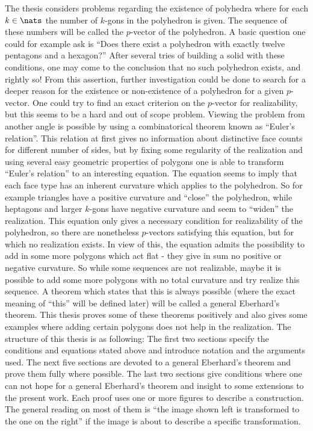 The thesis considers problems regarding the existence of polyhedra where for each $k \in \nats$ the number of $k$-gons in the polyhedron is given. The sequence of these numbers will be called the $p$-vector of the polyhedron. A basic question one could for example ask is ``Does there exist a polyhedron with exactly twelve pentagons and a hexagon?'' After several tries of building a solid with these conditions, one may come to the conclusion that no such polyhedron exists, and rightly so! From this assertion, further investigation could be done to search for a deeper reason for the existence or non-existence of a polyhedron for a given $p$-vector. One could try to find an exact criterion on the $p$-vector for realizability, but this seems to be a hard and out of scope problem. Viewing the problem from another angle is possible by using a combinatorical theorem known as ``Euler's relation''. This relation at first gives no information about distinctive face counts for different number of sides, but by fixing some regularity of the realization and using several easy geometric properties of polygons one is able to transform ``Euler's relation'' to an interesting equation. The equation seems to imply that each face type has an inherent curvature which applies to the polyhedron. So for example triangles have a positive curvature and ``close'' the polyhedron, while heptagons and larger $k$-gons have negative curvature and seem to ``widen'' the realization. This equation only gives a necessary condition for realizability of the polyhedron, so there are nonetheless $p$-vectors satisfying this equation, but for which no realization exists. In view of this, the equation admits the possibility to add in some more polygons which act flat - they give in sum no positive or negative curvature. So while some sequences are not realizable, maybe it is possible to add some more polygons with no total curvature and try realize this sequence. A theorem which states that this is always possible (where the exact meaning of ``this'' will be defined later) will be called a general Eberhard's theorem. This thesis proves some of these theorems positively and also gives some examples where adding certain polygons does not help in the realization. The structure of this thesis is as following: The first two sections specify the conditions and equations stated above and introduce notation and the arguments used. The next five sections are devoted to a general Eberhard's theorem and prove them fully where possible. The last two sections give conditions where one can not hope for a general Eberhard's theorem and insight to some extensions to the present work. Each proof uses one or more figures to describe a construction. The general reading on most of them is ``the image shown left is transformed to the one on the right'' if the image is about to describe a specific transformation.
